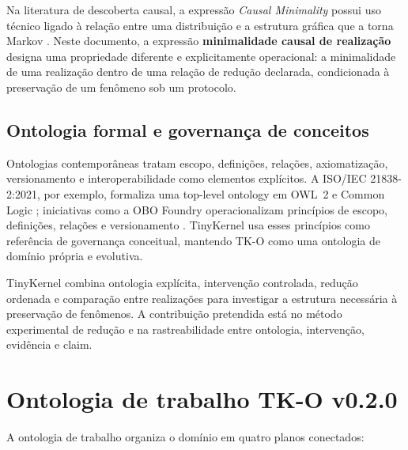 \documentclass[11pt,a4paper]{article}
\begin{document}
Na literatura de descoberta causal, a expressão \emph{Causal Minimality} possui uso
técnico ligado à relação entre uma distribuição e a estrutura gráfica que a torna
Markov \cite{spirtes2001,peters2017}. Neste documento, a expressão
\textbf{minimalidade causal de realização} designa uma propriedade diferente e
explicitamente operacional: a minimalidade de uma realização dentro de uma relação de
redução declarada, condicionada à preservação de um fenômeno sob um protocolo.

\subsection{Ontologia formal e governança de conceitos}

Ontologias contemporâneas tratam escopo, definições, relações, axiomatização,
versionamento e interoperabilidade como elementos explícitos. A ISO/IEC 21838-2:2021,
por exemplo, formaliza uma top-level ontology em OWL~2 e Common Logic
\cite{iso21838bfo}; iniciativas como a OBO Foundry operacionalizam princípios de
escopo, definições, relações e versionamento \cite{obofoundry2021}. TinyKernel usa
esses princípios como referência de governança conceitual, mantendo TK-O como uma
ontologia de domínio própria e evolutiva.

\begin{thesisbox}
TinyKernel combina ontologia explícita, intervenção controlada, redução ordenada e
comparação entre realizações para investigar a estrutura necessária à preservação de
fenômenos. A contribuição pretendida está no método experimental de redução e na
rastreabilidade entre ontologia, intervenção, evidência e claim.
\end{thesisbox}

\section{Ontologia de trabalho TK-O v0.2.0}

A ontologia de trabalho organiza o domínio em quatro planos conectados:
\end{document}
